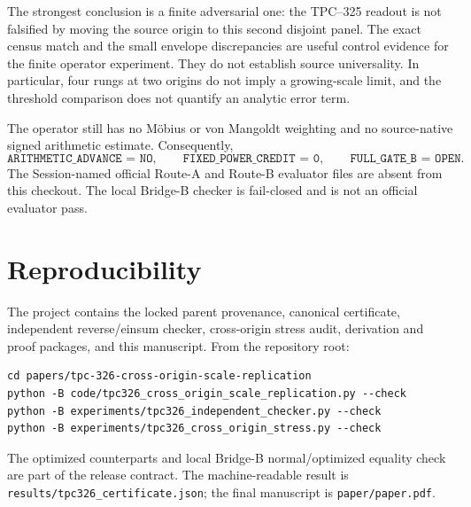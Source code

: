 \documentclass[10pt]{article}
\begin{document}
The strongest conclusion is a finite adversarial one: the TPC--325 readout
is not falsified by moving the source origin to this second disjoint panel.
The exact census match and the small envelope discrepancies are useful
control evidence for the finite operator experiment.  They do not establish
source universality.  In particular, four rungs at two origins do not imply
a growing-scale limit, and the threshold comparison does not quantify an
analytic error term.

The operator still has no Möbius or von Mangoldt weighting and no
source-native signed arithmetic estimate.  Consequently,
\[
\texttt{ARITHMETIC\_ADVANCE = NO},\qquad
\texttt{FIXED\_POWER\_CREDIT = 0},\qquad
\texttt{FULL\_GATE\_B = OPEN}.
\]
The Session-named official Route-A and Route-B evaluator files are absent
from this checkout.  The local Bridge-B checker is fail-closed and is not
an official evaluator pass.

\section{Reproducibility}

The project contains the locked parent provenance, canonical certificate,
independent reverse/einsum checker, cross-origin stress audit, derivation and
proof packages, and this manuscript.  From the repository root:
\begin{verbatim}
cd papers/tpc-326-cross-origin-scale-replication
python -B code/tpc326_cross_origin_scale_replication.py --check
python -B experiments/tpc326_independent_checker.py --check
python -B experiments/tpc326_cross_origin_stress.py --check
\end{verbatim}
The optimized counterparts and local Bridge-B normal/optimized equality
check are part of the release contract.  The machine-readable result is
\texttt{results/tpc326\_certificate.json}; the final manuscript is
\texttt{paper/paper.pdf}.



\end{document}
